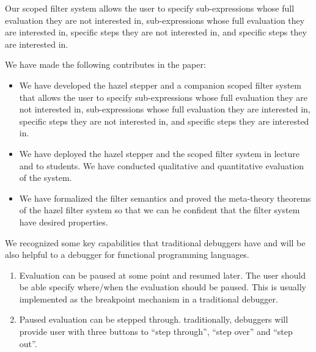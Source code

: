 
Our scoped filter system allows the user to specify sub-expressions whose full
evaluation they are not interested in, sub-expressions whose full evaluation
they are interested in, specific steps they are not interested in, and specific
steps they are interested in.



We have made the following contributes in the paper:
\begin{itemize}
  \item We have developed the hazel stepper and a companion scoped filter system
    that allows the user to specify sub-expressions whose full evaluation they
    are not interested in, sub-expressions whose full evaluation they are
    interested in, specific steps they are not interested in, and specific steps
    they are interested in.
  \item We have deployed the hazel stepper and the scoped filter system in
    lecture and to students. We have conducted qualitative and quantitative
    evaluation of the system.
  \item We have formalized the filter semantics and proved the meta-theory
    theorems of the hazel filter system so that we can be confident that the
    filter system have desired properties.
\end{itemize}




We recognized some key capabilities that traditional debuggers have and will be
also helpful to a debugger for functional programming languages.
\begin{enumerate}
  \item Evaluation can be paused at some point and resumed later. The user
    should be able specify where/when the evaluation should be paused. This is
    usually implemented as the breakpoint mechanism in a traditional debugger.
  \item Paused evaluation can be stepped through. traditionally, debuggers will
    provide user with three buttons to ``step through'', ``step over'' and
    ``step out''.
\end{enumerate}

